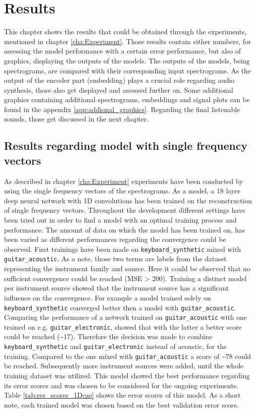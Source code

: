 \chapter[Results]{Results}
\label{cha:Results}

This chapter shows the results that could be obtained through the experiments, mentioned in chapter \ref{cha:Experiment}. Those results contain either numbers, for assessing the model performance with a certain error performance, but also of graphics, displaying the outputs of the models. The outputs of the models, being spectrograms, are compared with their corresponding input spectrograms. As the output of the encoder part (embedding) plays a crucial role regarding audio synthesis, those also get displayed and assessed further on. Some additional graphics containing additional spectrograms, embeddings and signal plots can be found in the appendix \ref{app:addional_graphics}. Regarding the final listenable sounds, those get discussed in the next chapter.

\section{Results regarding model with single frequency vectors}
As described in chapter \ref{cha:Experiment} experiments have been conducted by using the single frequency vectors of the spectrograms. As a model, a 18 layer deep neural network with 1D convolutions has been trained on the reconstruction of single frequency vectors. 
Throughout the development different settings have been tried out in order to find a model with an optimal training process and performance. The amount of data on which the model has been trained on, has been varied as different performances regarding the convergence could be observed. First trainings have been made on \texttt{keyboard\_synthetic} mixed with \texttt{guitar\_acoustic}. As a note, those two terms are labels from the dataset representing the instrument family and source. Here it could be observed that no sufficient convergence could be reached (MSE > 200). Training a distinct model per instrument source showed that the instrument source has a significant influence on the convergence. For example a model trained solely on \texttt{keyboard\_synthetic} converged better then a model with \texttt{guitar\_acoustic}. Comparing the performance of a network trained on \texttt{guitar\_acoustic} with one trained on e.g. \texttt{guitar\_electronic}, showed that with the latter a better score could be reached (\textasciitilde 17). Therefore the decision was made to combine \texttt{keyboard\_synthetic} and \texttt{guitar\_electronic} instead of acoustic, for the training. Compared to the one mixed with \texttt{guitar\_acoustic} a score of \textasciitilde 78 could be reached. Subsequently more instrument sources were added, until the whole training dataset was utilized. This model showed the best performance regarding its error scores and was chosen to be considered for the ongoing experiments. Table \ref{tab:res_scores_1Dcae} shows the error scores of this model. As a short note, each trained model was chosen based on the best validation error score. 

